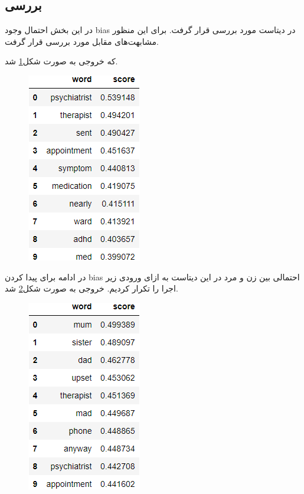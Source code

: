 \documentclass[10pt]{article}
\begin{document}
\subsection{بررسی
}
در این بخش احتمال وجود bias در دیتاست مورد بررسی قرار گرفت.
برای این منظور مشابهت‌های مقابل مورد بررسی قرار گرفت.
\begin{flushleft}
\end{flushleft}

که خروجی به صورت شکل\ref{word2vec-man} شد.

	
\begin{figure}[H]
		\centering\includegraphics[width=0.3\linewidth]{../reports/word2vec/bias-man.png}
		\caption{ 
			}
		\label{word2vec-man}
	\end{figure}
در ادامه برای پیدا کردن bias احتمالی بین زن و مرد در این دیتاست به ازای ورودی زیر اجرا را تکرار کردیم. خروجی به صورت شکل\ref{word2vec-woman} شد. 
\begin{flushleft}
\end{flushleft}

	\begin{figure}[H]
	\centering\includegraphics[width=0.3\linewidth]{../reports/word2vec/bias-woman.png}
	\caption{ 
		}
	\label{word2vec-woman}
	\end{figure}
\end{document}
